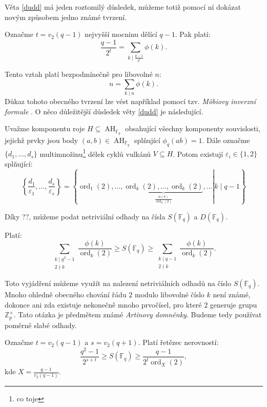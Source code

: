\documentclass[12pt]{report}
\DeclareMathOperator{\ord}{ord}
\DeclareMathOperator{\AH}{AH}
\begin{document}
Věta \ref{dudd} má jeden roztomilý důsledek, můžeme totiž pomocí ní dokázat novým způsobem jedno známé tvrzení.

\begin{dusledek}
Označme $t = v_2(q-1)$ nejvyšší mocninu dělící $q-1$. Pak platí:
$$\frac{q-1}{2^t} = \sum_{k \mid \frac{q-1}{2^t}} \phi(k).$$
\end{dusledek}

Tento vztah platí bezpodmínečně pro libovolné $n$:
\begin{equation}\label{mob}
n = \sum_{k \mid n} \phi(k).
\end{equation}
Důkaz tohoto obecného tvrzení lze vést například pomocí tzv. \textit{M\"{o}biovy inverzní formule} \cite[Ch.3 Thm 2.]{Ireland}. O něco důležitější důsledek věty \ref{dudd} je následující.

\begin{dusledek}
Uvažme komponentu roje $H \subseteq \AH_{\mathbb{F}_q}$ obsahující všechny komponenty souvislosti, jejichž prvky jsou body $(a,b) \in \AH_{\mathbb{F}_q}$ splňující $\phi_q(ab)=1$. Dále označme $\lbrace d_1,\dots,d_s \rbrace$ multimnožinu\footnote{co toje} délek cyklů vulkánů $V \subseteq H$. Potom existují $\varepsilon_i \in \lbrace 1,2 \rbrace$ splňující:
$$\left\lbrace \frac{d_1}{\varepsilon_1},\dots,\frac{d_s}{\varepsilon_s} \right\rbrace = \left\lbrace \left. \ord_1(2),\dots, \underbrace{\ord_k(2),\dots,\ord_k(2)}_{\frac{\phi(k)}{\ord_k(2)}},\dots \right\vert k \mid q-1 \right\rbrace$$
\end{dusledek}

Díky ??, můžeme podat netriviální odhady na čísla $S(\mathbb{F}_q)$ a $D(\mathbb{F}_q)$.

\begin{veta}
Platí:
$$\sum_{\substack{k \mid q^2-1 \\ 2 \nmid k}} \frac{\phi(k)}{\ord_k (2)} \geqslant S(\mathbb{F}_q) \geqslant \sum_{\substack{k \mid q-1 \\ 2 \nmid k}} \frac{\phi(k)}{\ord_k (2)}.$$
\end{veta}


Toto vyjádření můžeme využít na nalezení netriviálních odhadů na číslo $S(\mathbb{F}_q)$. Mnoho ohledně obecného chování řádu $2$ modulo libovolné číslo $k$ není známé, dokonce ani zda existuje nekonečně mnoho prvočísel, pro které $2$ generuje grupu $\mathbb{Z}_{p} ^{\times}$. Tato otázka je předmětem známé \textit{Artinovy domněnky}. Budeme tedy používat poměrně slabé odhady.

\begin{veta}\label{odhad} 
Označme $t = v_2(q-1)$ a $s = v_2(q+1)$. Platí řetězec nerovností:
$$\frac{q^2-1}{2^{s+t}} \geqslant S(\mathbb{F}_q) \geqslant \frac{q-1}{2^t \ord_X ( 2 )},$$
kde $X = \frac{q-1}{v_2(q-1)}$.
\end{veta}
\end{document}
